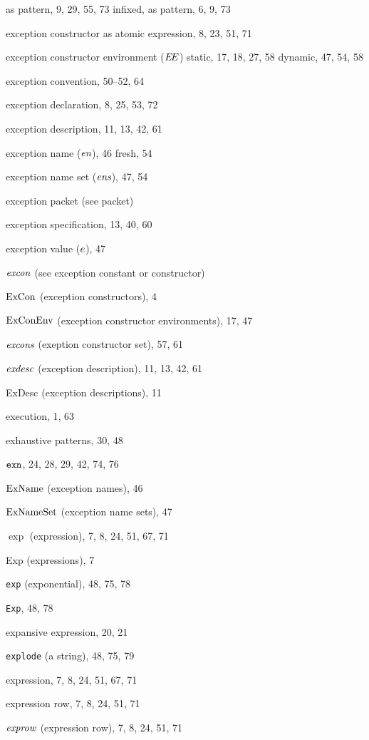 \begin{theindex}
\subitem as pattern, 9, 29, 55, 73
\subitem infixed, as pattern, 6, 9, 73
\item exception constructor 
\subitem as atomic expression, 8, 23, 51, 71
\item exception constructor environment ($\mbox{$E\!E$}$) 
\subitem static, 17, 18, 27, 58
\subitem dynamic, 47, 54, 58
\item exception convention, 50--52, 64
\item exception declaration, 8, 25, 53, 72
\item exception description, 11, 13, 42, 61
\item exception name ($\mbox{\it en}$), 46
\subitem fresh, 54
\item exception name set ($\mbox{\it ens}$), 47, 54
\item exception packet (see packet) 
\item exception specification, 13, 40, 60
\item exception value ($e$), 47
\item ${\it excon}$ (see exception constant or constructor) 
\item ${\rm ExCon}$ (exception constructors), 4
\item ${\rm ExConEnv}$ (exception constructor environments), 17, 47
\item $\mbox{\it excons}$ (exeption constructor set), 57, 61
\item ${\it exdesc}$ (exception description), 11, 13, 42, 61
\item ExDesc (exception descriptions), 11
\item execution, 1, 63
\item exhaustive patterns, 30, 48
\item $\mbox{\tt exn}$, 24, 28, 29, 42, 74, 76
\item ${\rm ExName}$ (exception names), 46
\item ${\rm ExNameSet}$ (exception name sets), 47
\item $\exp$ (expression), 7, 8, 24, 51, 67, 71
\item Exp (expressions), 7
\item {\tt exp} (exponential), 48, 75, 78
\item {\tt Exp}, 48, 78
\item expansive expression, 20, 21
\item {\tt explode} (a string), 48, 75, 79
\item expression, 7, 8, 24, 51, 67, 71
\item expression row, 7, 8, 24, 51, 71
\item ${\it exprow}$ (expression row), 7, 8, 24, 51, 71

\end{theindex}
